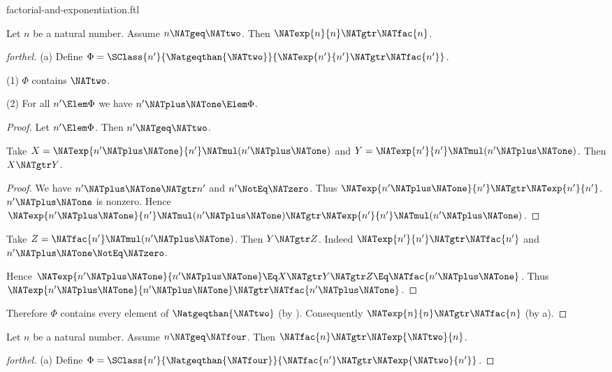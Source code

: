 \documentclass{stex}
\begin{document}
\begin{smodule}{factorial-and-exponentiation.ftl}

\begin{proposition}[forthel,id=ARITHMETIC_12_8113296594960384]
  Let $n$ be a natural number.
  Assume $n \NATgeq \NATtwo$.
  Then $\NATexp{n}{n} \NATgtr \NATfac{n}$.
\end{proposition}
\begin{proof}[forthel]
  (a) Define $\Phi = \SClass{n'}{\Natgeqthan{\NATtwo}}{\NATexp{n'}{n'} \NATgtr \NATfac{n'}}$.

  (1) $\Phi$ contains $\NATtwo$.

  (2) For all $n' \Elem \Phi$ we have $n' \NATplus \NATone \Elem \Phi$.
  \begin{proof}
    Let $n' \Elem \Phi$.
    Then $n' \NATgeq \NATtwo$.

    Take $X = \NATexp{n' \NATplus \NATone}{n'} \NATmul (n' \NATplus \NATone)$ and $Y = \NATexp{n'}{n'} \NATmul (n' \NATplus \NATone)$.
    Then $X \NATgtr Y$.
    \begin{proof}
      We have $n' \NATplus \NATone \NATgtr n'$ and $n' \NotEq \NATzero$.
      Thus $\NATexp{n' \NATplus \NATone}{n'} \NATgtr \NATexp{n'}{n'}$.
      $n' \NATplus \NATone$ is nonzero.
      Hence $\NATexp{n' \NATplus \NATone}{n'} \NATmul (n' \NATplus \NATone) \NATgtr \NATexp{n'}{n'} \NATmul (n' \NATplus \NATone)$.
    \end{proof}

    Take $Z = \NATfac{n'} \NATmul (n' \NATplus \NATone)$.
    Then $Y \NATgtr Z$.
    Indeed $\NATexp{n'}{n'} \NATgtr \NATfac{n'}$ and $n' \NATplus \NATone \NotEq \NATzero$.

    Hence $\NATexp{n' \NATplus \NATone}{n' \NATplus \NATone} \Eq X \NATgtr Y \NATgtr Z \Eq \NATfac{n' \NATplus \NATone}$.
    Thus $\NATexp{n' \NATplus \NATone}{n' \NATplus \NATone} \NATgtr \NATfac{n' \NATplus \NATone}$.
  \end{proof}

  Therefore $\Phi$ contains every element of $\Natgeqthan{\NATtwo}$ (by ).
  Consequently $\NATexp{n}{n} \NATgtr \NATfac{n}$ (by a).
\end{proof}

\begin{proposition}[forthel,id=ARITHMETIC_12_5413271156817920]
  Let $n$ be a natural number.
  Assume $n \NATgeq \NATfour$.
  Then $\NATfac{n} \NATgtr \NATexp{\NATtwo}{n}$.
\end{proposition}
\begin{proof}[forthel]
  (a) Define $\Phi = \SClass{n'}{\Natgeqthan{\NATfour}}{\NATfac{n'} \NATgtr \NATexp{\NATtwo}{n'}}$.


\end{proof}
\end{smodule}
\end{document}
